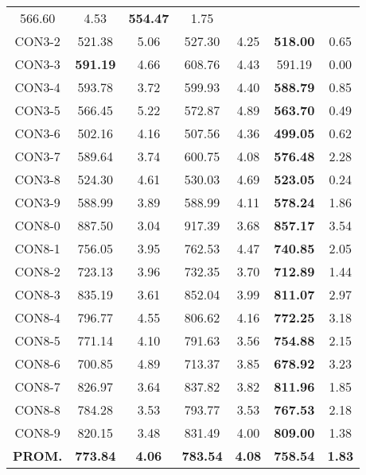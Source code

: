 \begin{table}[ht]
\begin{tabular}{c c c c c c c}
566.60 & 4.53 & \bf{554.47} & 
1.75\\CON3-2 & 521.38 & 5.06 & 
527.30 & 4.25 & \bf{518.00} & 
0.65\\CON3-3 & \bf{591.19} & 4.66 & 
608.76 & 4.43 & 591.19 & 0.00\\
CON3-4 & 593.78 & 3.72 & 
599.93 & 4.40 & \bf{588.79} & 
0.85\\CON3-5 & 566.45 & 5.22 & 
572.87 & 4.89 & \bf{563.70} & 
0.49\\CON3-6 & 502.16 & 4.16 & 
507.56 & 4.36 & \bf{499.05} & 
0.62\\CON3-7 & 589.64 & 3.74 & 
600.75 & 4.08 & \bf{576.48} & 
2.28\\CON3-8 & 524.30 & 4.61 & 
530.03 & 4.69 & \bf{523.05} & 
0.24\\CON3-9 & 588.99 & 3.89 & 
588.99 & 4.11 & \bf{578.24} & 
1.86\\CON8-0 & 887.50 & 3.04 & 
917.39 & 3.68 & \bf{857.17} & 
3.54\\CON8-1 & 756.05 & 3.95 & 
762.53 & 4.47 & \bf{740.85} & 
2.05\\CON8-2 & 723.13 & 3.96 & 
732.35 & 3.70 & \bf{712.89} & 
1.44\\CON8-3 & 835.19 & 3.61 & 
852.04 & 3.99 & \bf{811.07} & 
2.97\\CON8-4 & 796.77 & 4.55 & 
806.62 & 4.16 & \bf{772.25} & 
3.18\\CON8-5 & 771.14 & 4.10 & 
791.63 & 3.56 & \bf{754.88} & 
2.15\\CON8-6 & 700.85 & 4.89 & 
713.37 & 3.85 & \bf{678.92} & 
3.23\\CON8-7 & 826.97 & 3.64 & 
837.82 & 3.82 & \bf{811.96} & 
1.85\\CON8-8 & 784.28 & 3.53 & 
793.77 & 3.53 & \bf{767.53} & 
2.18\\CON8-9 & 820.15 & 3.48 & 
831.49 & 4.00 & \bf{809.00} & 
1.38\\\bf{PROM.} & 
\bf{773.84} & \bf{4.06} & \bf{783.54} & \bf{4.08} & \bf{758.54} & \bf{1.83}\\[1ex]\hline
\end{tabular}
\label{table:nonlin}
\end{table} \clearpage
